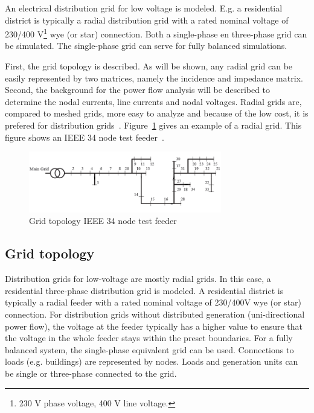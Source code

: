 An electrical distribution grid for low voltage is modeled. E.g. a residential district is typically a radial distribution grid with a rated nominal voltage of 230/400 V\footnote{230 V phase voltage, 400 V line voltage.} wye (or star) connection. Both a single-phase en three-phase grid can be simulated. The single-phase grid can serve for fully balanced simulations.

First, the grid topology is described. As will be shown, any radial grid can be easily represented by two matrices, namely the incidence and impedance matrix. Second, the background for the power flow analysis will be described to determine the nodal currents, line currents and nodal voltages. Radial grids are, compared to meshed grids, more easy to analyze and because of the low cost, it is prefered for distribution grids~\cite{ehaesen}. Figure~\ref{figIEEE} gives an example of a radial grid. This figure shows an IEEE 34 node test feeder~\cite{IEEE_testfeeder}.

\begin{figure}[ht]
\centerline{\includegraphics[width=0.75\textwidth, angle=0]{Electric/MyGraphics/grid_ieee34.png}}
\caption{Grid topology IEEE 34 node test feeder~\cite{IEEE_testfeeder}}
\label{figIEEE}
\end{figure}

\subsection{Grid topology}
Distribution grids for low-voltage are mostly radial grids. In this case, a residential three-phase distribution grid is modeled. A residential district is typically a radial feeder with a rated no\-mi\-nal voltage of 230/400V wye (or star) connection. For distribution grids without distributed generation (uni-directional power flow), the voltage at the feeder typically has a higher value to ensure that the voltage in the whole feeder stays within the preset boundaries. For a fully balanced system, the single-phase equivalent grid can be used. Connections to loads (e.g. buildings) are represented by nodes. Loads and generation units can be single or three-phase connected to the grid.

